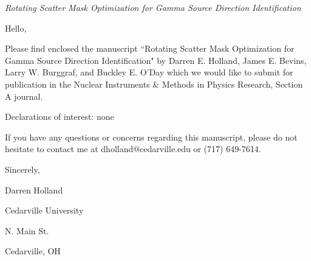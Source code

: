 \documentclass{article}
\begin{document}
\textit{Rotating Scatter Mask Optimization for Gamma Source Direction Identification}
\vspace{0.25in}

\noindent Hello,

Please find enclosed the manuscript ``Rotating Scatter Mask Optimization for Gamma Source Direction Identification" by Darren E. Holland, James E. Bevins, Larry W. Burggraf, and Buckley E. O'Day which we would like to submit for publication in the Nuclear Instruments \& Methods in Physics Research, Section A journal. 
\vspace{0.15in}

Declarations of interest: none
\vspace{0.15in}

If you have any questions or concerns regarding this manuscript, please do not hesitate to contact me at dholland@cedarville.edu or (717) 649-7614.
\vspace{0.15in}

\noindent Sincerely,
\vspace{0.15in}

\noindent Darren Holland
\vspace{0.15in}

\noindent Cedarville University

 N. Main St.

\noindent Cedarville, OH

\vspace{0.25in}



\end{document}
